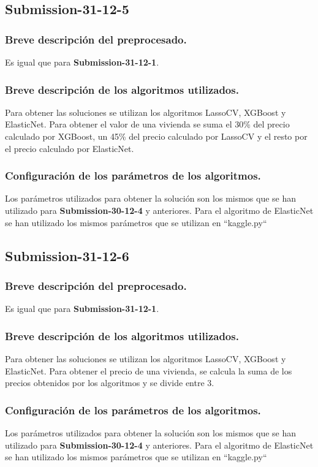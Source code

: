 	\subsection{Submission-31-12-5}
	\subsubsection{Breve descripción del preprocesado.}
	Es igual que para \textbf{Submission-31-12-1}.
	\subsubsection{Breve descripción de los algoritmos utilizados.}
	Para obtener las soluciones se utilizan los algoritmos LassoCV, XGBoost y ElasticNet. Para obtener el valor de una vivienda se suma el 30\% del precio calculado por XGBoost, un 45\% del precio calculado por LassoCV y el resto por el precio calculado por ElasticNet.
	\subsubsection{Configuración de los parámetros de los algoritmos.}
	Los parámetros utilizados para obtener la solución son los mismos que se han utilizado para \textbf{Submission-30-12-4} y anteriores. Para el algoritmo de ElasticNet se han utilizado los mismos parámetros que se utilizan en ``kaggle.py``
	
	\subsection{Submission-31-12-6}
	\subsubsection{Breve descripción del preprocesado.}
	Es igual que para \textbf{Submission-31-12-1}.
	\subsubsection{Breve descripción de los algoritmos utilizados.}
	Para obtener las soluciones se utilizan los algoritmos LassoCV, XGBoost y ElasticNet. Para obtener el precio de una vivienda, se calcula la suma de los precios obtenidos por los algoritmos y se divide entre 3.
	\subsubsection{Configuración de los parámetros de los algoritmos.}
	Los parámetros utilizados para obtener la solución son los mismos que se han utilizado para \textbf{Submission-30-12-4} y anteriores. Para el algoritmo de ElasticNet se han utilizado los mismos parámetros que se utilizan en ``kaggle.py``
	
